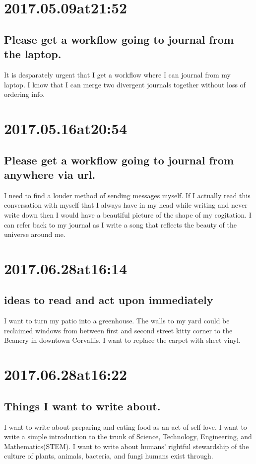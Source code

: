 \begin{enumerate}
\begin{enumerate}
\section*{ 2017.05.09at21:52 }
\subsection*{ Please get a workflow going to journal from the laptop. }
It is desparately urgent that I get a workflow where I can journal from my laptop.
I know that I can merge two divergent journals together without loss of ordering info.

\section*{ 2017.05.16at20:54 }
\subsection*{ Please get a workflow going to journal from anywhere via url. }
I need to find a louder method of sending messages myself.
If I actually read this conversation with myself that I always have in my head while writing and never write down then I would have a beautiful picture of the shape of my cogitation.
I can refer back to my journal as I write a song that reflects the beauty of the universe around me.

\section*{ 2017.06.28at16:14 }
\subsection*{ ideas to read and act upon immediately }
I want to turn my patio into a greenhouse.
The walls to my yard could be reclaimed windows from between first and second street kitty corner to the Beanery in downtown Corvallis.
I want to replace the carpet with sheet vinyl.

\section*{ 2017.06.28at16:22 }
\subsection*{ Things I want to write about. }
I want to write about preparing and eating food as an act of self-love. I want to write a simple introduction to the trunk of Science, Technology, Engineering, and Mathematics(STEM). I want to write about humans' rightful stewardship of the culture of plants, animals, bacteria, and fungi humans exist through.


\end{enumerate}
\end{enumerate}
